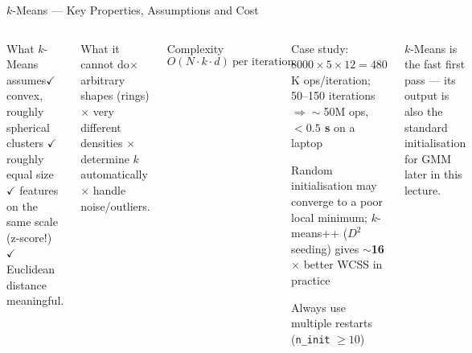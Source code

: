 \documentclass[aspectratio=169,10pt,t]{beamer}
\begin{document}
\begin{frame}{$k$-Means --- Key Properties, Assumptions and Cost}
\begin{columns}[T]
\begin{cbox}[ISSAgrn]{What $k$-Means assumes}\scriptsize $\checkmark$ convex, roughly spherical clusters $\checkmark$ roughly equal size $\checkmark$ features on the same scale (z-score!) $\checkmark$ Euclidean distance meaningful.\end{cbox}
\begin{cbox}[ISSAred]{What it cannot do}\scriptsize $\times$ arbitrary shapes (rings) $\times$ very different densities $\times$ determine $k$ automatically $\times$ handle noise/outliers.\end{cbox}
\begin{fbx}{Complexity}\[O(N\cdot k\cdot d)\ \text{per iteration}\]\end{fbx}
\begin{tl}\item Case study: $8000\times5\times12=480$K ops/iteration; 50--150 iterations $\Rightarrow\sim$50M ops, \textbf{$<0.5$ s} on a laptop\item Random initialisation may converge to a poor local minimum; $k$-means++ ($D^2$ seeding) gives \textbf{$\sim$16$\times$} better WCSS in practice\item Always use multiple restarts (\texttt{n\_init} $\ge10$)\end{tl}
\begin{ibox}\scriptsize $k$-Means is the fast first pass --- its output is also the standard initialisation for GMM later in this lecture.\end{ibox}
\end{columns}
\end{frame}
\end{document}
